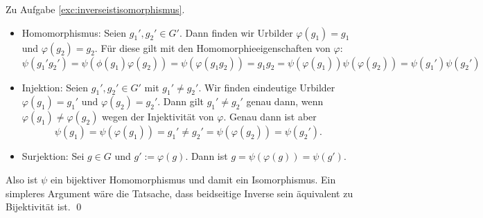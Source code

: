 \begin{lösung} Zu Aufgabe \ref{exc:inverseistisomorphismus}.
\begin{itemize}
\item Homomorphismus: Seien $g_1', g_2' \in G'$. Dann finden wir Urbilder $\varphi(g_1)=g_1$ und $\varphi(g_2)=g_2$. Für diese gilt mit den Homomorphieeigenschaften von $\varphi$:
\begin{equation}
\psi(g_1'g_2') = \psi(\phi(g_1)\varphi(g_2))=\psi(\varphi(g_1g_2)) = g_1g_2=\psi(\varphi(g_1))\psi(\varphi(g_2))=\psi(g_1')\psi(g_2')
\end{equation}
\item Injektion: Seien $g_1',g_2' \in G'$ mit $g_1' \neq g_2'$. Wir finden eindeutige Urbilder $\varphi(g_1)=g_1'$ und $\varphi(g_2)=g_2'$. Dann gilt $g_1' \neq g_2'$ genau dann, wenn $\varphi(g_1) \neq \varphi(g_2)$ wegen der Injektivität von $\varphi$. Genau dann ist aber 
\begin{equation}
\psi(g_1) = \psi(\varphi(g_1)) = g_1' \neq g_2' = \psi(\varphi(g_2)) = \psi(g_2').
\end{equation}
\item Surjektion: Sei $g \in G$ und $g':= \varphi(g)$. Dann ist $g= \psi(\varphi(g))=\psi(g')$.
\end{itemize}
Also ist $\psi$ ein bijektiver Homomorphismus und damit ein Isomorphismus. Ein simpleres Argument wäre die Tatsache, dass beidseitige Inverse sein äquivalent zu Bijektivität ist. \qed
\end{lösung}